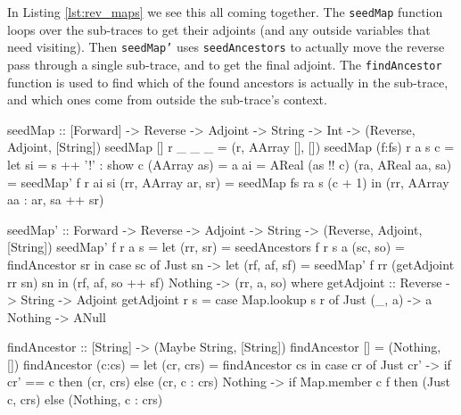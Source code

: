         In Listing \ref{lst:rev_maps} we see this all coming together.
        The \texttt{seedMap} function loops over the sub-traces to get their adjoints (and any outside variables that need visiting).
        Then \texttt{seedMap'} uses \texttt{seedAncestors} to actually move the reverse pass through a single sub-trace, and to get the final adjoint.
        The \texttt{findAncestor} function is used to find which of the found ancestors is actually in the sub-trace, and which ones come from outside the sub-trace's context.

        \begin{haskell}[caption=Functions for the reverse pass through maps, label=lst:rev_maps, gobble=12]
            seedMap :: [Forward] -> Reverse -> Adjoint -> String -> Int
                -> (Reverse, Adjoint, [String])
            seedMap []     r _ _ _ = (r, AArray [], [])
            seedMap (f:fs) r a s c =
                let si                  = s ++ '!' : show c
                    (AArray as)         = a
                    ai                  = AReal (as !! c)
                    (ra, AReal  aa, sa) = seedMap' f r ai si 
                    (rr, AArray ar, sr) = seedMap fs ra s (c + 1)
                in (rr, AArray aa : ar, sa ++ sr)

            seedMap' :: Forward -> Reverse -> Adjoint -> String
                -> (Reverse, Adjoint, [String])
            seedMap' f r a s =
                let (rr, sr) = seedAncestors f r s a
                    (sc, so) = findAncestor sr
                in  case sc of
                    Just sn -> 
                        let (rf, af, sf) = seedMap' f rr (getAdjoint rr sn) sn
                        in  (rf, af, so ++ sf)
                    Nothing -> (rr, a, so)
                where
                    getAdjoint :: Reverse -> String -> Adjoint
                    getAdjoint r s = case Map.lookup s r of
                        Just (_, a) -> a
                        Nothing     -> ANull
                    
                    findAncestor :: [String] -> (Maybe String, [String])
                    findAncestor []     = (Nothing, [])
                    findAncestor (c:cs) =
                        let (cr, crs) = findAncestor cs
                        in  case cr of
                            Just cr' -> if cr' == c then (cr, crs) else (cr, c : crs)
                            Nothing  ->
                                if   Map.member c f 
                                then (Just c, crs)
                                else (Nothing, c : crs)
        \end{haskell}

